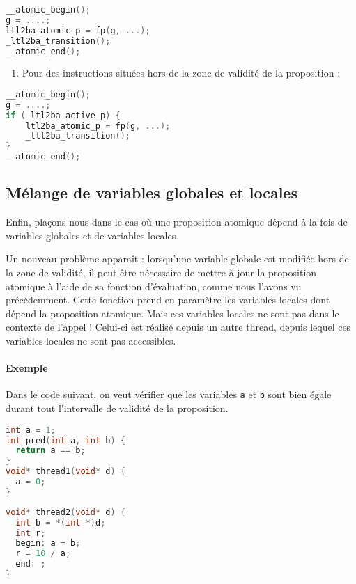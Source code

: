 \begin{lstlisting}[language=C, frame=single, caption=Instrumentation pour une
  variable globale dans la zone de validité]
__atomic_begin();
g = ....;
ltl2ba_atomic_p = fp(g, ...);
_ltl2ba_transition();
__atomic_end();
\end{lstlisting}

\begin{enumerate}
\def\labelenumi{\arabic{enumi})}
\setcounter{enumi}{1}
\item
  Pour des instructions situées hors de la zone de validité de la
  proposition :
\end{enumerate}

\begin{lstlisting}[language=C, frame=single, caption=Instrumentation pour une
  variable globale hors de la zone de validité]
__atomic_begin();
g = ....;
if (_ltl2ba_active_p) {
    ltl2ba_atomic_p = fp(g, ...);
    _ltl2ba_transition();
}
__atomic_end();
\end{lstlisting}

\subsection{Mélange de variables globales et locales}

Enfin, plaçons nous dans le cas où une proposition atomique dépend à la
fois de variables globales et de variables locales.

Un nouveau problème apparaît : lorsqu'une variable globale est modifiée
hors de la zone de validité, il peut être nécessaire de mettre à jour la
proposition atomique à l'aide de sa fonction d'évaluation, comme nous
l'avons vu précédemment. Cette fonction prend en paramètre les variables
locales dont dépend la proposition atomique. Mais ces variables locales
ne sont pas dans le contexte de l'appel ! Celui-ci est réalisé depuis un
autre thread, depuis lequel ces variables locales ne sont pas
accessibles.

\paragraph{Exemple}
Dans le code suivant, on veut vérifier que les variables \texttt{a} et
\texttt{b} sont bien égale durant tout l'intervalle de validité de la
proposition.

\noindent\begin{minipage}{.45\textwidth}
\begin{lstlisting}[language=C, frame=single, caption=Thread 1]
int a = 1;
int pred(int a, int b) {
  return a == b;
}
void* thread1(void* d) {
  a = 0;
}
\end{lstlisting}
\end{minipage}\hfill
\begin{minipage}{.45\textwidth}
\begin{lstlisting}[language=C, frame=single, caption=Thread 2]
void* thread2(void* d) {
  int b = *(int *)d;
  int r;
  begin: a = b;
  r = 10 / a;
  end: ;
}
\end{lstlisting}
\end{minipage}

